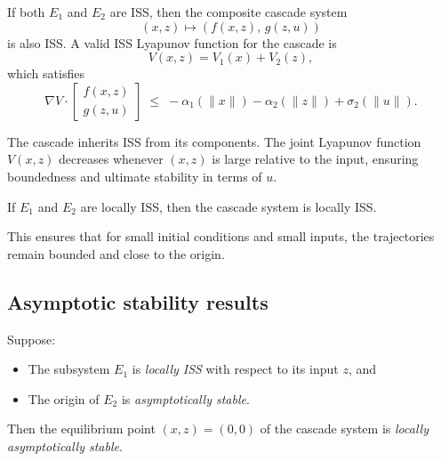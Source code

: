 \begin{theorem}
If both $E_1$ and $E_2$ are ISS, then the composite cascade system
\[
(x,z) \mapsto (f(x,z),\, g(z,u))
\]
is also ISS. A valid ISS Lyapunov function for the cascade is
\begin{equation}
    V(x,z) = V_1(x) + V_2(z),
\end{equation}
which satisfies
\begin{equation}
\nabla V \cdot 
\begin{bmatrix} f(x,z) \\ g(z,u) \end{bmatrix}
\;\le\; -\alpha_1(\|x\|) - \alpha_2(\|z\|) + \sigma_2(\|u\|).
\end{equation}
\end{theorem}

\begin{remark}
The cascade inherits ISS from its components. The joint Lyapunov function $V(x,z)$ 
decreases whenever $(x,z)$ is large relative to the input, ensuring boundedness and 
ultimate stability in terms of $u$.
\end{remark}

\begin{theorem}
If $E_1$ and $E_2$ are locally ISS, then the cascade system is locally ISS.
\end{theorem}

\begin{remark}
This ensures that for small initial conditions and small inputs, the trajectories 
remain bounded and close to the origin.
\end{remark}

\subsection{Asymptotic stability results}

\begin{corollary}
Suppose:
\begin{itemize}
    \item The subsystem $E_1$ is \emph{locally ISS} with respect to its input $z$, and
    \item The origin of $E_2$ is \emph{asymptotically stable}.
\end{itemize}
Then the equilibrium point $(x,z)=(0,0)$ of the cascade system is \emph{locally asymptotically stable}.
\end{corollary}

